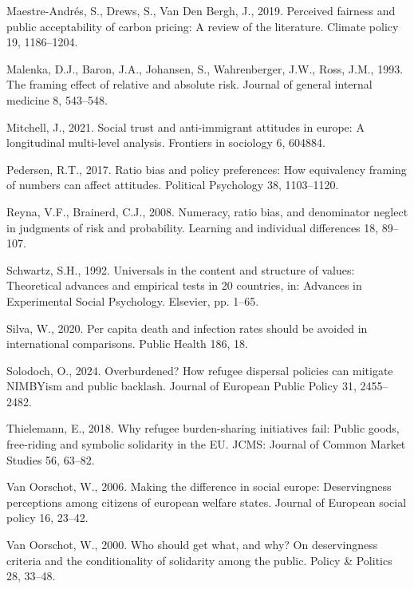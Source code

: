 \documentclass[
  12pt,
  a4paper,
]{article}
\newlength{\cslhangindent}
\newenvironment{CSLReferences}[2] %
 {\begin{list}{}{%
  \setlength{\itemindent}{0pt}
  \setlength{\leftmargin}{0pt}
  \setlength{\parsep}{0pt}
  \ifodd #1
   \setlength{\leftmargin}{\cslhangindent}
   \setlength{\itemindent}{-1\cslhangindent}
  \fi
  \setlength{\itemsep}{#2\baselineskip}}}
 {\end{list}}
\begin{document}
\begin{CSLReferences}{1}{0}
Maestre-Andrés, S., Drews, S., Van Den Bergh, J., 2019. Perceived fairness and public acceptability of carbon pricing: A review of the literature. Climate policy 19, 1186--1204.

Malenka, D.J., Baron, J.A., Johansen, S., Wahrenberger, J.W., Ross, J.M., 1993. The framing effect of relative and absolute risk. Journal of general internal medicine 8, 543--548.

Mitchell, J., 2021. Social trust and anti-immigrant attitudes in europe: A longitudinal multi-level analysis. Frontiers in sociology 6, 604884.

Pedersen, R.T., 2017. Ratio bias and policy preferences: How equivalency framing of numbers can affect attitudes. Political Psychology 38, 1103--1120.

Reyna, V.F., Brainerd, C.J., 2008. Numeracy, ratio bias, and denominator neglect in judgments of risk and probability. Learning and individual differences 18, 89--107.

Schwartz, S.H., 1992. Universals in the content and structure of values: Theoretical advances and empirical tests in 20 countries, in: Advances in Experimental Social Psychology. Elsevier, pp. 1--65.

Silva, W., 2020. Per capita death and infection rates should be avoided in international comparisons. Public Health 186, 18.

Solodoch, O., 2024. Overburdened? How refugee dispersal policies can mitigate NIMBYism and public backlash. Journal of European Public Policy 31, 2455--2482.

Thielemann, E., 2018. Why refugee burden-sharing initiatives fail: Public goods, free-riding and symbolic solidarity in the EU. JCMS: Journal of Common Market Studies 56, 63--82.

Van Oorschot, W., 2006. Making the difference in social europe: Deservingness perceptions among citizens of european welfare states. Journal of European social policy 16, 23--42.

Van Oorschot, W., 2000. Who should get what, and why? On deservingness criteria and the conditionality of solidarity among the public. Policy \& Politics 28, 33--48.

\end{CSLReferences}
\end{document}
